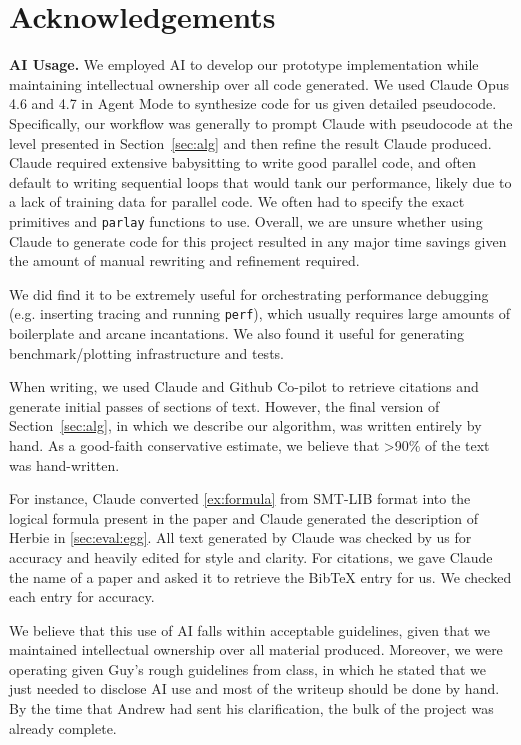 \section{Acknowledgements}
\label{sec:acks}

\textbf{AI Usage.} We employed AI  to develop our prototype implementation while
maintaining intellectual ownership over all code generated. We used Claude Opus
4.6 and 4.7 in Agent Mode to synthesize code for us given detailed pseudocode.
Specifically, our workflow was generally to prompt Claude with pseudocode at the
level presented in Section~\ref{sec:alg} and then refine the result Claude
produced. Claude required extensive babysitting to write good parallel code, and
often default to writing sequential loops that would tank our performance,
likely due to a lack of training data for parallel code. We often had to specify
the exact primitives and \texttt{parlay} functions to use. Overall, we are
unsure whether using Claude to generate code for this project resulted in any
major time savings given the amount of manual rewriting and refinement required.

We did find it to be extremely useful for orchestrating performance debugging
(e.g. inserting tracing and running \texttt{perf}), which usually requires large
amounts of boilerplate and arcane incantations. We also found it useful for
generating benchmark/plotting infrastructure and tests. 

When writing, we used Claude and Github Co-pilot to retrieve citations and
generate initial passes of sections of text. However, the final version of
Section~\ref{sec:alg}, in which we describe our algorithm, was written entirely by hand.
As a good-faith conservative estimate, we believe that >90\% of the text was
hand-written.

For instance, Claude converted \autoref{ex:formula} from SMT-LIB format into the logical formula present in the
paper and Claude generated the description of Herbie in \autoref{sec:eval:egg}.
All text generated by Claude was checked by us for accuracy and heavily edited
for style and clarity. For citations, we gave Claude the name of a paper and
asked it to retrieve the BibTeX entry for us. We checked each entry for
accuracy.

We believe that this use of AI falls within acceptable guidelines, given that we
maintained intellectual ownership over all material produced. Moreover, we were
operating given Guy's rough guidelines from class, in which he stated that we
just needed to disclose AI use and most of the writeup should be done by hand.
By the time that Andrew had sent his clarification, the bulk of the project was
already complete.
